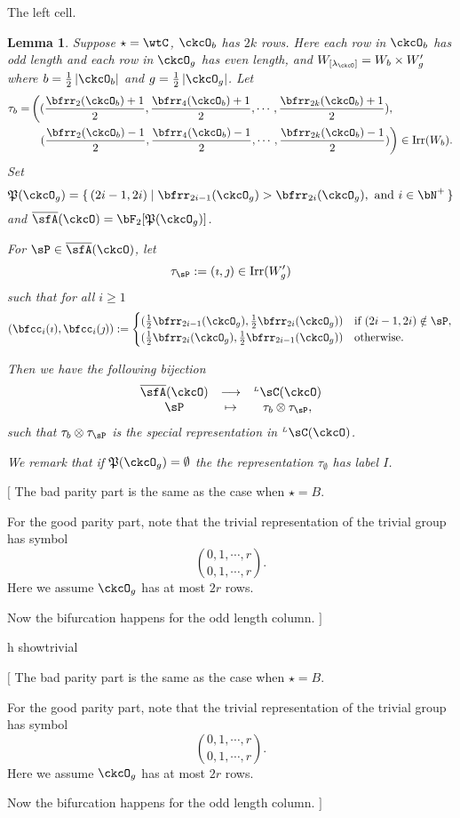 \documentclass[12pt,a4paper]{amsart}
\newcommand{\trivial}[2][]{\if\relax\detokenize{#1}\relax
  {%
      \color{orange} \vspace{0em} $[$  #2 $]$
      \color{black}
  }
  \else
\ifx#1h
\ifcsname showtrivial\endcsname
{%
    \color{orange} \vspace{0em}  $[$ #2 $]$
    \color{black}
}
\fi
\else {\red Wrong argument!} \fi
\fi
}
\def\abs#1{\left|{#1}\right|}
\newcommand{\CQ}{{\mathcal {Q}}}
\numberwithin{equation}{section}
\newtheorem{lem}[thm]{Lemma}
\theoremstyle{remark}
\def\half{{\tfrac{1}{2}}}
\def\Irr{\mathrm{Irr}}
\def\WLamck{W_{[\lambda_{\ckcO}]}}
\def\LC{{}^{\scriptscriptstyle L}\sC}
\def\CQ{\overline{\sfA}}%
\def\CPP{\mathfrak{P}}
\begin{document}
The left cell.
\begin{lem}
  Suppose $\star = \wtC$, $\ckcO_{b}$ has $2k$ rows. Here each row in $\ckcO_{b}$ has
  odd length and each row in $\ckcO_{g}$ has even length, and
  $\WLamck = W_{b}\times W'_{g}$ where $b=\half \abs{\ckcO_{b}}$ and
  $g = \half\abs{\ckcO_{g}}$.
  Let
  \[
    \begin{split}
      \tau_{b} =  & \left( (\frac{\bfrr_{2}(\ckcO_{b})+1}{2}, \frac{\bfrr_{4}(\ckcO_{b})+1}{2}, \cdots, \frac{\bfrr_{2k}(\ckcO_{b})+1}{2}),\right.\\
        &\ \ \left. (\frac{\bfrr_{2}(\ckcO_{b})-1}{2}, \frac{\bfrr_{4}(\ckcO_{b})-1}{2}, \cdots, \frac{\bfrr_{2k}(\ckcO_{b})-1}{2})\right) \in \Irr(W_{b}).
    \end{split}
  \]
  Set
  \[
    \CPP(\ckcO_{g}) = \set{(2i-1,2i)| \bfrr_{2i-1}(\ckcO_{g})> \bfrr_{2i}(\ckcO_{g}), \text{
        and } i\in \bN^{+}}
  \]
  and $\CQ(\ckcO)= \bF_{2}[\CPP(\ckcO_{g})]$.

  For $\sP \in \CQ(\ckcO)$, let
  \[
    \tau_{\sP} := (\imath,\jmath) \in \Irr(W'_{g})
  \]
  such that for all $i\geq 1$
  \[
  (\bfcc_{i}(\imath), \bfcc_{i}(\jmath)):=
  \begin{cases}
    (\half \bfrr_{2i-1}(\ckcO_{g}), \half \bfrr_{2i}(\ckcO_{g}))
    & \text{if } (2i-1,2i)\notin \sP,\\
    (\half \bfrr_{2i}(\ckcO_{g}),\half \bfrr_{2i-1}(\ckcO_{g})) & \text{otherwise.}
  \end{cases}
  \]

  Then we have the following bijection
  \[
    \begin{array}{ccc}
      \CQ(\ckcO) &\longrightarrow & \LC(\ckcO)\\
      \sP & \mapsto & \tau_{b}\otimes \tau_{\sP},
    \end{array}
  \]
  such that $\tau_{b}\otimes \tau_{\sP}$ is the special representation in
  $\LC(\ckcO)$.

  We remark that if $\CPP(\ckcO_{g})=\emptyset$ the the
  representation $\tau_{\emptyset}$ has label $I$.
\end{lem}

\trivial{
  The bad parity part is the same as the case when $\star= B$.


  For the good parity part, note that the trivial representation of
  the trivial group has symbol
  \[
    \binom{0,1,\cdots, r}{0,1,\cdots, r}.
  \]
  Here we assume $\ckcO_{g}$ has at most $2r$ rows.

  Now the bifurcation happens for the odd length column.
  }
\end{document}
